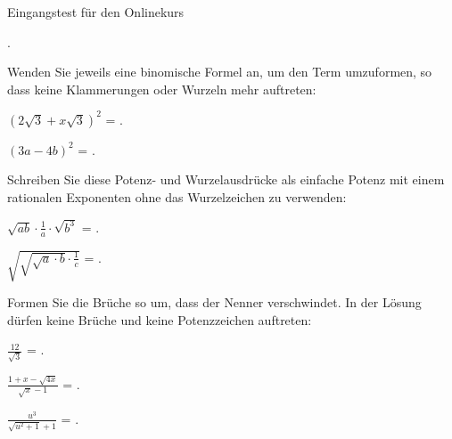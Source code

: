 \begin{MTest}{Eingangstest für den Onlinekurs}
\begin{MExercise}
.
\end{MExercise}

\begin{MExercise}
Wenden Sie jeweils eine binomische Formel an, um den Term umzuformen, so dass keine Klammerungen oder Wurzeln mehr auftreten:
\begin{MExerciseItems}
\item{$(2\sqrt3+x\sqrt3)^2$ = .}
\item{$(3a-4b)^2$ = .}
\end{MExerciseItems}
\end{MExercise}

\begin{MExercise}
Schreiben Sie diese Potenz- und Wurzelausdrücke als einfache Potenz mit einem rationalen Exponenten ohne das Wurzelzeichen zu verwenden:
\begin{MExerciseItems}
\item{$\sqrt{a b}\cdot \frac1{a}\cdot \sqrt{b^{3}}$ = .}
\item{$\sqrt{\sqrt{\sqrt{a}\cdot b}\cdot\frac1c}$ = .}
\end{MExerciseItems}
\end{MExercise}

\begin{MExercise}
Formen Sie die Brüche so um, dass der Nenner verschwindet. In der Lösung dürfen keine Brüche und keine Potenzzeichen auftreten:
\begin{MExerciseItems}
\item{$\frac{12}{\sqrt{3}}$ = .}
\item{$\frac{1+x-\sqrt{4x}}{\sqrt{x}-1}$ = .}
\item{$\frac{u^3}{\sqrt{u^2+1}+1}$ = .}
\end{MExerciseItems}
\end{MExercise}


\end{MTest}
